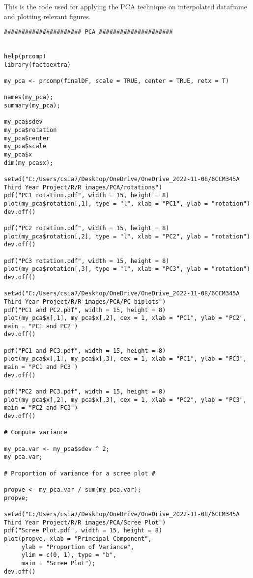 This is the code used for applying the PCA technique on interpolated dataframe and plotting relevant figures.
\begin{verbatim}
###################### PCA #####################


help(prcomp)
library(factoextra)

my_pca <- prcomp(finalDF, scale = TRUE, center = TRUE, retx = T)

names(my_pca);
summary(my_pca);

my_pca$sdev
my_pca$rotation
my_pca$center
my_pca$scale
my_pca$x
dim(my_pca$x);

setwd("C:/Users/csia7/Desktop/OneDrive/OneDrive_2022-11-08/6CCM345A Third Year Project/R/R images/PCA/rotations")
pdf("PC1 rotation.pdf", width = 15, height = 8) 
plot(my_pca$rotation[,1], type = "l", xlab = "PC1", ylab = "rotation")
dev.off()

pdf("PC2 rotation.pdf", width = 15, height = 8) 
plot(my_pca$rotation[,2], type = "l", xlab = "PC2", ylab = "rotation")
dev.off()

pdf("PC3 rotation.pdf", width = 15, height = 8) 
plot(my_pca$rotation[,3], type = "l", xlab = "PC3", ylab = "rotation")
dev.off()

setwd("C:/Users/csia7/Desktop/OneDrive/OneDrive_2022-11-08/6CCM345A Third Year Project/R/R images/PCA/PC biplots")
pdf("PC1 and PC2.pdf", width = 15, height = 8) 
plot(my_pca$x[,1], my_pca$x[,2], cex = 1, xlab = "PC1", ylab = "PC2", main = "PC1 and PC2")
dev.off()

pdf("PC1 and PC3.pdf", width = 15, height = 8) 
plot(my_pca$x[,1], my_pca$x[,3], cex = 1, xlab = "PC1", ylab = "PC3", main = "PC1 and PC3")
dev.off()

pdf("PC2 and PC3.pdf", width = 15, height = 8) 
plot(my_pca$x[,2], my_pca$x[,3], cex = 1, xlab = "PC2", ylab = "PC3", main = "PC2 and PC3")
dev.off()

# Compute variance

my_pca.var <- my_pca$sdev ^ 2;
my_pca.var;

# Proportion of variance for a scree plot #

propve <- my_pca.var / sum(my_pca.var);
propve;

setwd("C:/Users/csia7/Desktop/OneDrive/OneDrive_2022-11-08/6CCM345A Third Year Project/R/R images/PCA/Scree Plot")
pdf("Scree Plot.pdf", width = 15, height = 8) 
plot(propve, xlab = "Principal Component",
     ylab = "Proportion of Variance",
     ylim = c(0, 1), type = "b",
     main = "Scree Plot");
dev.off()


\end{verbatim}
